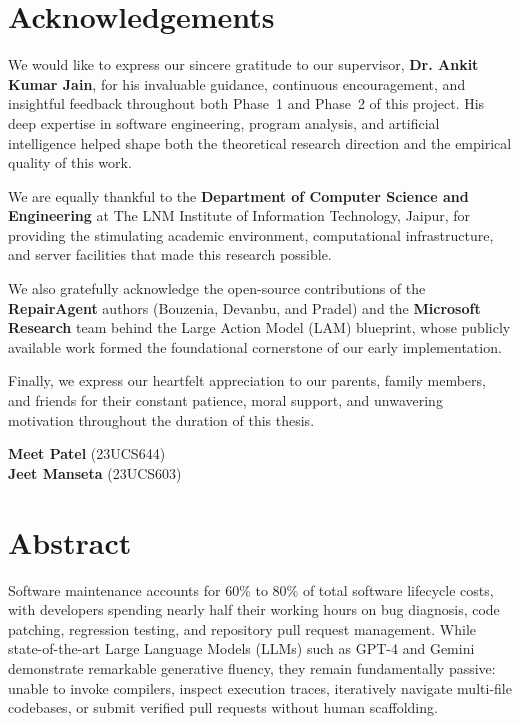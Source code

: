 \documentclass[12pt,a4paper]{report}
\begin{document}
\chapter*{Acknowledgements}

We would like to express our sincere gratitude to our supervisor, \textbf{Dr. Ankit Kumar Jain}, for his invaluable guidance, continuous encouragement, and insightful feedback throughout both Phase~1 and Phase~2 of this project. His deep expertise in software engineering, program analysis, and artificial intelligence helped shape both the theoretical research direction and the empirical quality of this work.

We are equally thankful to the \textbf{Department of Computer Science and Engineering} at The LNM Institute of Information Technology, Jaipur, for providing the stimulating academic environment, computational infrastructure, and server facilities that made this research possible.

We also gratefully acknowledge the open-source contributions of the \textbf{RepairAgent} authors (Bouzenia, Devanbu, and Pradel) and the \textbf{Microsoft Research} team behind the Large Action Model (LAM) blueprint, whose publicly available work formed the foundational cornerstone of our early implementation.

Finally, we express our heartfelt appreciation to our parents, family members, and friends for their constant patience, moral support, and unwavering motivation throughout the duration of this thesis.

\vspace{1.5cm}
\begin{flushright}
    \textbf{Meet Patel} (23UCS644)\\
    \textbf{Jeet Manseta} (23UCS603)
\end{flushright}

\newpage
\chapter*{Abstract}

Software maintenance accounts for 60\% to 80\% of total software lifecycle costs, with developers spending nearly half their working hours on bug diagnosis, code patching, regression testing, and repository pull request management. While state-of-the-art Large Language Models (LLMs) such as GPT-4 and Gemini demonstrate remarkable generative fluency, they remain fundamentally passive: unable to invoke compilers, inspect execution traces, iteratively navigate multi-file codebases, or submit verified pull requests without human scaffolding.
\end{document}
